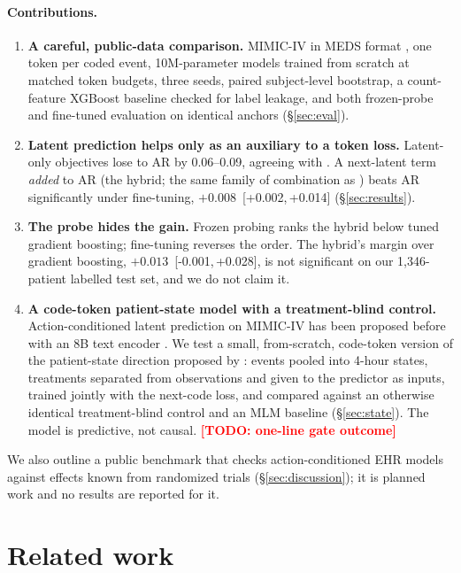 \documentclass[10pt,letterpaper]{article}
\newcommand{\todo}[1]{\textcolor{red}{\textbf{[TODO: #1]}}}
\newcommand{\ci}[2]{\,[{#1},\,{#2}]}
\begin{document}
\paragraph{Contributions.}
\begin{enumerate}[leftmargin=*,itemsep=2pt,topsep=2pt]
\item \textbf{A careful, public-data comparison.} MIMIC-IV \citep{mimiciv} in
MEDS format \citep{meds}, one token per coded event, 10M-parameter models
trained from scratch at matched token budgets, three seeds, paired
subject-level bootstrap, a count-feature XGBoost baseline checked for label
leakage, and both frozen-probe and fine-tuned evaluation on identical anchors
(\S\ref{sec:eval}).
\item \textbf{Latent prediction helps only as an auxiliary to a token loss.}
Latent-only objectives lose to AR by 0.06--0.09, agreeing with
\citet{imperialjepa}. A next-latent term \emph{added} to AR (the hybrid; the
same family of combination as \citep{smbstructure}) beats AR significantly under fine-tuning,
$+0.008$ \ci{+0.002}{+0.014} (\S\ref{sec:results}).
\item \textbf{The probe hides the gain.} Frozen probing ranks the hybrid below
tuned gradient boosting; fine-tuning reverses the order. The hybrid's margin
over gradient boosting, $+0.013$ \ci{-0.001}{+0.028}, is not significant on our
1{,}346-patient labelled test set, and we do not claim it.
\item \textbf{A code-token patient-state model with a treatment-blind control.}
Action-conditioned latent prediction on MIMIC-IV has been proposed before
with an 8B text encoder \citep{clinjepa}. We test a small, from-scratch,
code-token version of the patient-state direction proposed by
\citet{imperialjepa}: events pooled into 4-hour states, treatments separated
from observations and given to the predictor as inputs, trained jointly with
the next-code loss, and compared against an otherwise identical
treatment-blind control and an MLM baseline (\S\ref{sec:state}). The model
is predictive, not causal. \todo{one-line gate outcome}
\end{enumerate}
We also outline a public benchmark that checks action-conditioned EHR models
against effects known from randomized trials (\S\ref{sec:discussion}); it is
planned work and no results are reported for it.

\section{Related work}
\label{sec:related}
\end{document}
